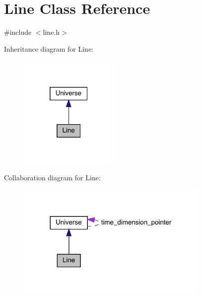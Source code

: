\hypertarget{class_line}{}\section{Line Class Reference}
\label{class_line}


{\ttfamily \#include $<$line.\+h$>$}



Inheritance diagram for Line\+:\nopagebreak
\begin{figure}[H]
\begin{center}
\leavevmode
\includegraphics[width=136pt]{class_line__inherit__graph}
\end{center}
\end{figure}


Collaboration diagram for Line\+:\nopagebreak
\begin{figure}[H]
\begin{center}
\leavevmode
\includegraphics[width=263pt]{class_line__coll__graph}
\end{center}
\end{figure}
